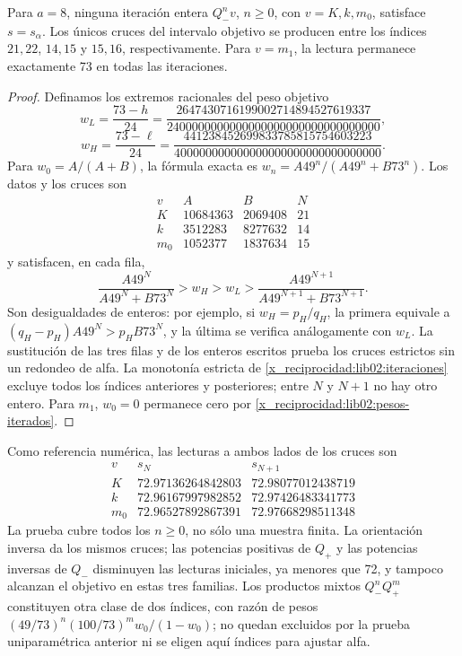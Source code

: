 \begin{proposition}
\label{x_reciprocidad:lib02:cruces-enteros}
Para \(a=8\), ninguna iteración entera \(Q_-^nv\), \(n\geq0\),
con \(v=K,k,m_0\), satisface \(s=s_\alpha\). Los únicos cruces
del intervalo objetivo se producen entre los índices \(21,22\),
\(14,15\) y \(15,16\), respectivamente. Para \(v=m_1\), la
lectura permanece exactamente 73 en todas las iteraciones.
\end{proposition}
\begin{proof}
Definamos los extremos racionales del peso objetivo
\[
 w_L=\frac{73-h}{24}
 =\frac{2647430716199002714894527619337}
 {2400000000000000000000000000000000},
\]
\[
 w_H=\frac{73-\ell}{24}
 =\frac{441238452699833785815754603223}
 {400000000000000000000000000000000}.
\]
Para \(w_0=A/(A+B)\), la fórmula exacta es
\(w_n=A49^n/(A49^n+B73^n)\). Los datos y los cruces son
\[
\begin{array}{c|r|r|c}
 v&A&B&N\\\hline
 K&10684363&2069408&21\\
 k&3512283&8277632&14\\
 m_0&1052377&1837634&15
\end{array}
\]
y satisfacen, en cada fila,
\[
 \frac{A49^N}{A49^N+B73^N}>w_H>w_L>
 \frac{A49^{N+1}}{A49^{N+1}+B73^{N+1}}.
\]
Son desigualdades de enteros: por ejemplo, si
\(w_H=p_H/q_H\), la primera equivale a
\((q_H-p_H)A49^N>p_HB73^N\), y la última se verifica
análogamente con \(w_L\). La sustitución de las tres filas y de
los enteros escritos prueba los cruces estrictos sin un redondeo de
alfa. La monotonía estricta de \cref{x_reciprocidad:lib02:iteraciones} excluye
todos los índices anteriores y posteriores; entre \(N\) y
\(N+1\) no hay otro entero. Para \(m_1\), \(w_0=0\) permanece
cero por \eqref{x_reciprocidad:lib02:pesos-iterados}.
\end{proof}

Como referencia numérica, las lecturas a ambos lados de los cruces son
\[
\begin{array}{c|c|c}
 v&s_N&s_{N+1}\\\hline
 K&72.97136264842803&72.98077012438719\\
 k&72.96167997982852&72.97426483341773\\
 m_0&72.96527892867391&72.97668298511348
\end{array}
\]
La prueba cubre todos los \(n\geq0\), no sólo una muestra finita.
La orientación inversa da los mismos cruces; las potencias positivas de
\(Q_+\) y las potencias inversas de \(Q_-\) disminuyen las
lecturas iniciales, ya menores que 72, y tampoco alcanzan el objetivo
en estas tres familias. Los productos mixtos \(Q_-^nQ_+^m\)
constituyen otra clase de dos índices, con razón de pesos
\((49/73)^n(100/73)^m w_0/(1-w_0)\); no quedan excluidos por
la prueba uniparamétrica anterior ni se eligen aquí índices para ajustar
alfa.

